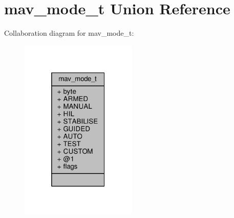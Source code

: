 \hypertarget{unionmav__mode__t}{\section{mav\+\_\+mode\+\_\+t Union Reference}
\label{unionmav__mode__t}
}


Collaboration diagram for mav\+\_\+mode\+\_\+t\+:
\nopagebreak
\begin{figure}[H]
\begin{center}
\leavevmode
\includegraphics[width=157pt]{unionmav__mode__t__coll__graph}
\end{center}
\end{figure}
